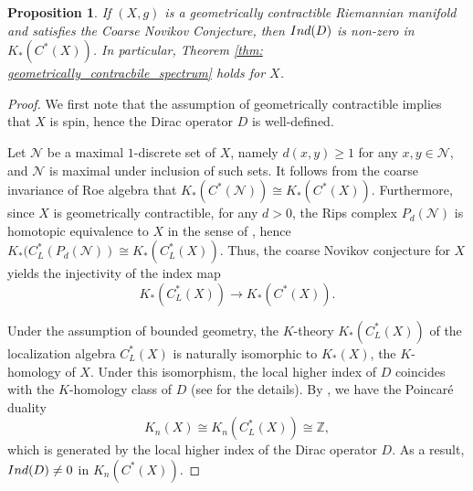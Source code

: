 \documentclass[12pt, reqno]{amsart}
\theoremstyle{plain}%
\newtheorem{proposition}[theorem]{Proposition}
\theoremstyle{definition}
\theoremstyle{remark}
\numberwithin{equation}{section}
\newcommand{\ind}{\textup{Ind}}
\begin{document}
\begin{proposition} \label{prop: novikov_nonzero_index}
	If $(X,g)$ is a geometrically contractible  Riemannian manifold and satisfies the Coarse Novikov Conjecture, then $\ind(D)$ is non-zero in $K_*(C^*(X))$. In particular, Theorem \ref{thm: geometrically_contracbile_spectrum} holds for $X$.
\end{proposition}
\begin{proof}
    We first note that the assumption of geometrically contractible implies that $X$ is spin, hence the Dirac operator $D$ is well-defined.
    
    Let $\mathcal N$ be a maximal $1$-discrete set of $X$, namely $d(x,y)\geq 1$ for any $x,y\in\mathcal N$, and $\mathcal N$ is maximal under inclusion of such sets. It follows from the coarse invariance of Roe algebra \cite[Theorem 5.1.15]{willett2020higher} that $K_*(C^*(\mathcal N))\cong K_*(C^*(X))$. Furthermore, since $X$ is geometrically contractible, for any $d>0$, the Rips complex $P_d(\mathcal N)$ is homotopic equivalence to $X$ in the sense of \cite[Theorem 6.4.16]{willett2020higher}, hence $K_*(C^*_L(P_d(\mathcal N))\cong K_*(C^*_L(X))$. Thus, the coarse Novikov conjecture for $X$ yields the injectivity of the index map
    $$K_*(C^*_L(X))\to K_*(C^*(X)).$$

    Under the assumption of bounded geometry, the $K$-theory $K_\ast(C^*_L(X))$ of the localization algebra $C^*_L(X)$ is naturally isomorphic to $K_*(X)$, the $K$-homology of $X$. Under this isomorphism, the local higher index of $D$ coincides with the $K$-homology class of $D$ (see \cite{Yulocalization,QiaoRoe} for the details).
    By \cite[Corollary 9.6.12]{willett2020higher}, we have the Poincar\'{e} duality
    $$K_n(X)\cong K_n(C^*_L(X))\cong \mathbb Z,$$
    which is generated by the local higher index of the Dirac operator $D$. As a result, $\ind(D)\ne 0$ in $K_n(C^*(X))$. 
\end{proof}
\end{document}
